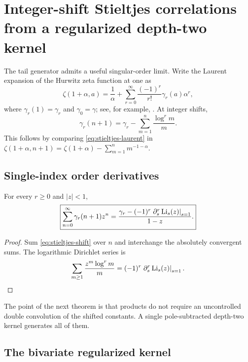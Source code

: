 \section{Integer-shift Stieltjes correlations from a regularized depth-two kernel}
\label{sec:stieltjes-generator}

The tail generator admits a useful singular-order limit.  Write the
Laurent expansion of the Hurwitz zeta function at one as
\begin{equation}
 \zeta(1+\alpha,a)=\frac1\alpha+
 \sum_{r=0}^{\infty}\frac{(-1)^r}{r!}\gamma_r(a)\alpha^r,
 \label{eq:stieltjes-laurent}
\end{equation}
where $\gamma_r(1)=\gamma_r$ and $\gamma_0=\gamma$; see, for example,
\cite{DLMF,Coffey}.  At integer shifts,
\begin{equation}
 \gamma_r(n+1)=\gamma_r-
 \sum_{m=1}^n\frac{\log^r m}{m}.
 \label{eq:stieltjes-shift}
\end{equation}
This follows by comparing \eqref{eq:stieltjes-laurent} in
$\zeta(1+\alpha,n+1)=\zeta(1+\alpha)-\sum_{m=1}^nm^{-1-\alpha}$.

\subsection{Single-index order derivatives}

\begin{proposition}
\label{prop:single-stieltjes-generator}
For every $r\ge0$ and $|z|<1$,
\begin{equation}
 \boxed{\displaystyle
 \sum_{n=0}^{\infty}\gamma_r(n+1)z^n
 =\frac{\gamma_r-(-1)^r
 \left.\partial_s^r\operatorname{Li}_s(z)\right|_{s=1}}{1-z}.}
 \label{eq:single-stieltjes-generator}
\end{equation}
\end{proposition}

\begin{proof}
Sum \eqref{eq:stieltjes-shift} over $n$ and interchange the absolutely
convergent sums.  The logarithmic Dirichlet series is
\[
 \sum_{m\ge1}\frac{z^m\log^r m}{m}
 =(-1)^r\left.\partial_s^r\operatorname{Li}_s(z)\right|_{s=1}.
\]
\end{proof}

The point of the next theorem is that products do not require an
uncontrolled double convolution of the shifted constants.  A single
pole-subtracted depth-two kernel generates all of them.

\subsection{The bivariate regularized kernel}


